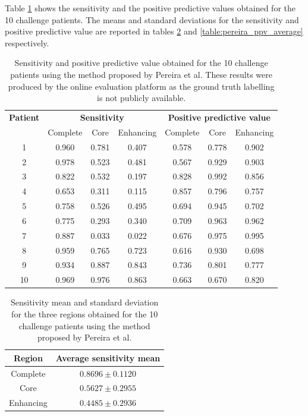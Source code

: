 \documentclass[12pt,a4paper,twoside,openright]{report}
\begin{document}
Table \ref{table:pereira_other_results} shows the sensitivity and the positive predictive values obtained for the 10 challenge patients. The means and standard deviations for the sensitivity and positive predictive value are reported in tables \ref{table:pereira_sensitivity_average} and \ref{table:pereira_ppv_average} respectively.
\begin{table}[h]
\centering	
\label{table:pereira_other_results}
\begin{tabular}{ c | c c c | c c c} 
\textbf{Patient} & \multicolumn{3}{c|}{\textbf{Sensitivity}} & \multicolumn{3}{c}{\textbf{Positive predictive value}}\\
 & Complete & Core & Enhancing & Complete & Core & Enhancing \\
\hline
1 & 0.960 &	0.781 & 0.407 & 0.578 & 0.778 & 0.902 \\
2 & 0.978 & 0.523 & 0.481 & 0.567 & 0.929 & 0.903 \\
3 & 0.822 & 0.532 & 0.197 &	0.828 & 0.992 & 0.856 \\
4 & 0.653 & 0.311 & 0.115 & 0.857 & 0.796 & 0.757 \\ 
5 & 0.758 & 0.526 & 0.495 & 0.694 & 0.945 & 0.702 \\
6 & 0.775 & 0.293 & 0.340 & 0.709 & 0.963 & 0.962 \\
7 & 0.887 & 0.033 & 0.022 & 0.676 & 0.975 & 0.995 \\
8 & 0.959 & 0.765 & 0.723 & 0.616 & 0.930 & 0.698 \\
9 & 0.934 & 0.887 & 0.843 & 0.736 & 0.801 & 0.777 \\
10 & 0.969 & 0.976 & 0.863 & 0.663 & 0.670 & 0.820 \\
\end{tabular}
\caption{Sensitivity and positive predictive value obtained for the 10 challenge patients using the method proposed by Pereira et al. These results were produced by the online evaluation platform as the ground truth labelling is not publicly available.}
\end{table}

\begin{table}[h]
\centering	
\label{table:pereira_sensitivity_average}
\begin{tabular}{ c | c } 
\textbf{Region} & \textbf{Average sensitivity mean} \\
 \hline
Complete &	$0.8696 \pm 0.1120$ \\
Core & 		$0.5627 \pm 0.2955$ \\
Enhancing & $0.4485  \pm 0.2936$ \\
\end{tabular}
\caption{Sensitivity mean and standard deviation for the three regions obtained for the 10 challenge patients using the method proposed by Pereira et al.}
\end{table}
\end{document}
